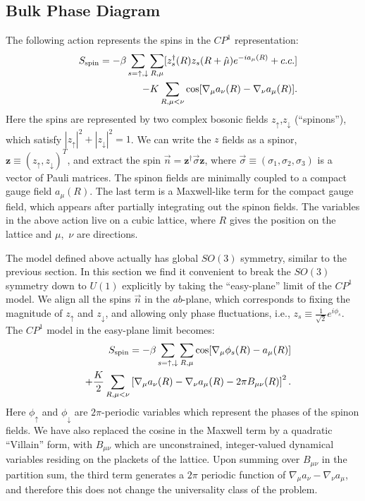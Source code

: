 \subsection{Bulk Phase Diagram}
The following action represents the spins in the $CP^1$ representation:
\begin{eqnarray}
&&S_{\rm spin}=-\beta\sum_{s=\uparrow,\downarrow}\sum_{R,\mu} [z_s^\dagger(R)z_s(R+\hat\mu)e^{-ia_\mu(R)}+c.c.] \nonumber\\
&&-K\sum_{R,\mu<\nu} \cos[\nabla_\mu a_\nu(R)-\nabla_\nu a_\mu(R)].
\label{cp1action}
\end{eqnarray} 
Here the spins are represented by two complex bosonic fields $z_\uparrow$,$z_\downarrow$ (``spinons''), which satisfy $|z_\uparrow|^2+|z_\downarrow|^2=1$. We can write the $z$ fields as a spinor, $\mathbf{z}\equiv(z_\uparrow,z_\downarrow)^T$, and extract the spin $\vec{n}=\mathbf{z^\dagger} \vec\sigma \mathbf{z}$, where $\vec{\sigma}\equiv (\sigma_1,\sigma_2,\sigma_3)$ is a vector of Pauli matrices.
The spinon fields are minimally coupled to a compact gauge field $a_\mu(R)$. The last term is a Maxwell-like term for the compact gauge field, which appears after partially integrating out the spinon fields. The variables in the above action live on a cubic lattice, where $R$ gives the position on the lattice and $\mu$,~$\nu$ are directions.

The \cp model defined above actually has global $SO(3)$ symmetry, similar to the previous section. In this section we find it convenient to break the $SO(3)$ symmetry down to $U(1)$ explicitly by taking the ``easy-plane'' limit of the $CP^1$ model. We align all the spins $\vec{n}$ in the $ab$-plane, which corresponds to fixing the magnitude of $z_\uparrow$ and $z_\downarrow$, and allowing only phase fluctuations, i.e., $z_s\equiv \frac{1}{\sqrt{2}}e^{i\phi_s}$. The $CP^1$ model in the easy-plane limit becomes:
\begin{eqnarray}
&&S_{\rm spin}=-\beta\sum_{s=\uparrow,\downarrow}\sum_{R,\mu} \cos[\nabla_\mu\phi_s(R)-a_\mu(R)]\nonumber\\
&&+\frac{K}{2}\sum_{R,\mu<\nu}\left[\nabla_\mu a_\nu(R)-\nabla_\nu a_\mu(R)-2\pi B_{\mu\nu}(R)\right]^2.
\label{sspin}
\end{eqnarray}
Here $\phi_\uparrow$ and $\phi_\downarrow$ are $2\pi$-periodic variables which represent the phases of the spinon fields. We have also replaced the cosine in the Maxwell term by a quadratic ``Villain'' form, with $B_{\mu\nu}$ which are unconstrained, integer-valued dynamical variables residing on the plackets of the lattice. Upon summing over $B_{\mu\nu}$ in the partition sum, the third term generates a $2\pi$ periodic function of $\nabla_\mu a_{\nu}-\nabla_\nu a_{\mu}$, and therefore this does not change the universality class of the problem.

